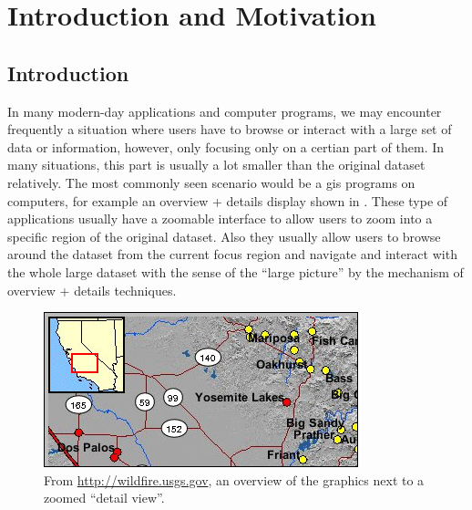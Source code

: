 
\chapter{Introduction and Motivation} %

\label{Chapter1} %


\section{Introduction}

In many modern-day applications and computer programs, we may encounter frequently a situation where users have to browse or interact with a large set of data or information, however, only focusing only on a certian part of them. In many situations, this part is usually a lot smaller than the original dataset relatively. The most commonly seen scenario would be a \gls{gis} programs on computers, for example an overview + details display shown in . These type of applications usually have a zoomable interface to allow users to zoom into a specific region of the original dataset. Also they usually allow users to browse around the dataset from the current focus region and navigate and interact with the whole large dataset with the sense of the ``large picture'' by the mechanism of overview + details techniques.

\begin{figure}[th]
\centering
\includegraphics{Figures/Chapter1/usgsmap.png}
\decoRule
\caption[Overview Plus Details On Map]{From \url{http://wildfire.usgs.gov}, an overview of the graphics next to a zoomed ``detail view''.}
\label{fig:usgsmap}
\end{figure}

